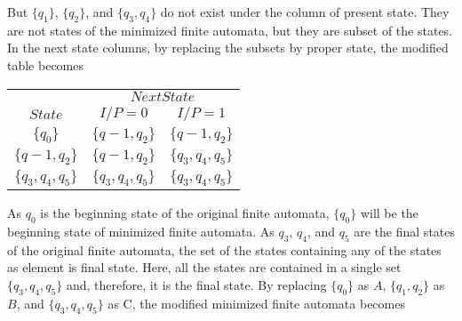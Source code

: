 \documentclass[a4,9pt]{beamer}
\begin{document}
\begin{frame}
But $\{q_1\}$, $\{q_2\}$, and $\{q_3, q_4\}$ do not exist under the column of present state. They are not states of the
minimized finite automata, but they are subset of the states. In the next state columns, by replacing the
subsets by proper state, the modified table becomes

\pause
\begin{center}
\begin{tabular}{ccc}
 \hline

 \hline

 \hline

 \hline
 & \multicolumn{2}{c}{$Next State$}\\
 \cline{2-3}
 $State$ &  $I/P=0$ & $I/P=1$\\
\hline
 $\{q_0\}$           &   $\{q-1,q_2\}$      &  $\{q-1,q_2\}$          \\
 $\{q-1,q_2\}$       &   $\{q-1,q_2\}$      &  $\{q_3,q_4,q_5\}$   \\
 $\{q_3,q_4,q_5\}$   &   $\{q_3,q_4,q_5\}$  &  $\{q_3,q_4,q_5\}$  \\
 \hline

 \hline

 \hline

 \hline
\end{tabular}
\end{center}

\pause
As $q_0$ is the beginning state of the original finite automata, $\{q_0\}$ will be the beginning state of minimized
finite automata. As $q_3$, $q_4$, and $q_5$ are the final states of the original finite automata, the set of the states
containing any of the states as element is final state. Here, all the states are contained in a single set
$\{q_3, q_4, q_5\}$ and, therefore, it is the final state. By replacing $\{q_0\}$ as $A$, $\{q_1, q_2\}$ as $B$, and $\{q_3, q_4, q_5\}$ as C,
the modified minimized finite automata becomes
\end{frame}
\end{document}

